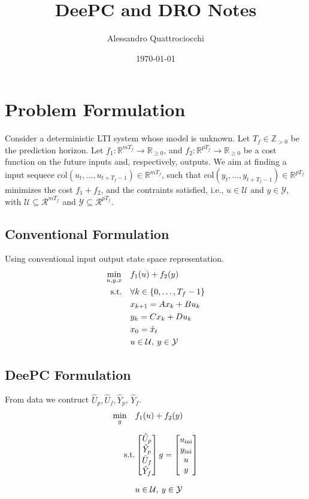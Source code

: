 \documentclass[12pt, a4paper]{article}
\title{DeePC and DRO Notes}
\author{Alessandro Quattrociocchi}
\date{\today}
\begin{document}
\maketitle
\tableofcontents

\section{Problem Formulation}
Consider a deterministic LTI system whose model is unknown. 
\noindent Let $T_f \in \mathbb{Z}_{> 0}$ be the prediction horizon. Let $f_1 : \mathbb{R}^{mT_f} \rightarrow \mathbb{R}_{\geq0}$, and $f_2 : \mathbb{R}^{pT_f} \rightarrow \mathbb{R}_{\geq0}$ be a cost function on the future inputs and, respectively, outputs. We aim at finding a input sequece $\text{col}(u_t, \dots, u_{t+T_f-1}) \in \mathbb{R}^{mT_f}$, such that $\text{col}(y_t, \dots, y_{t+T_f-1}) \in \mathbb{R}^{pT_f}$ minimizes the cost $f_1 + f_2$, and the contraints satisfied, i.e., $u \in \mathcal{U}$ and $y \in \mathcal{Y}$, with $\mathcal{U} \subseteq \mathcal{R}^{mT_f}$ and $\mathcal{Y} \subseteq \mathcal{R}^{pT_f}$.

\subsection{Conventional Formulation}
Using conventional input output state space representation. 
\begin{align} \label{eq:conventional}
    \min_{u,y,x} \quad & f_1(u) +f_2(y) \notag\\
    \text{s.t.} \quad & \forall k \in {\{0, \dots, T_f -1\}}\notag\\
    \quad & {x}_{k+1} = Ax_k + Bu_k \notag\\
    \quad & {y}_{k} = Cx_k + Du_k \notag\\
    & x_0 = \hat{x}_t \notag\\
    & u \in \mathcal{U}, \: y \in \mathcal{Y} 
\end{align}

\subsection{DeePC Formulation}
From data we contruct $\hat{U}_p, \hat{U}_f, \hat{Y}_p$, $\hat{Y}_f$.
\begin{align}
    \min_{g} \quad & f_1(u) + f_2(y) \notag\\[0.2cm]
    \text{s.t.} 
    &\begin{bmatrix} 
        \hat{U}_p \\ 
        \hat{Y}_p \\ 
        \hat{U}_f \\ 
        \hat{Y}_f 
        \end{bmatrix}g = \begin{bmatrix} 
            u_{\text{ini}} \\ 
            y_{\text{ini}}\\ 
            u \notag \\ 
            y
            \end{bmatrix}\\[0.2cm]
            & u \in \mathcal{U}, \: y \in \mathcal{Y} 
\end{align}
\end{document}
